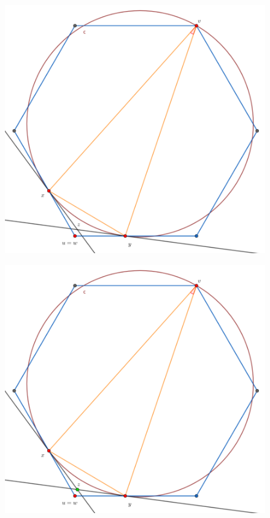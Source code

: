{\begin{frame}
  \begin{figure}
    \centering
    \includegraphics[width=.65 \paperwidth]{./images/Bosquejo17.png}
  \end{figure}
\end{frame}

\begin{frame}
  \begin{figure}
    \centering
    \includegraphics[width=.65 \paperwidth]{./images/Bosquejo18.png}
  \end{figure}
\end{frame}

}
